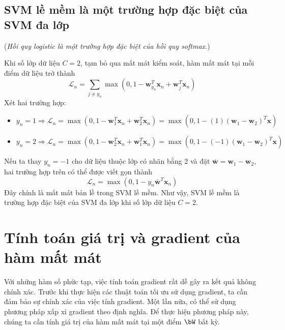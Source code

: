  
\subsection{SVM lề mềm là một trường hợp đặc biệt của SVM đa lớp}
(\textit{Hồi quy logistic là một trường hợp đặc biệt của hồi quy softmax.})

Khi số lớp dữ liệu $C = 2$, tạm bỏ qua mất mát kiểm soát, hàm mất mát tại mỗi điểm dữ liệu trở thành
\begin{equation} 
\mathcal{L}_n = \sum_{j \neq y_n} \max(0, 1 - \mathbf{w}_{y_n}^T \mathbf{x}_n + \mathbf{w}_j^T\mathbf{x}_n) 
\end{equation} 
Xét hai trường hợp: 
\begin{itemize}
    \item $y_n = 1 \Rightarrow \mathcal{L}_n = \max(0, 1 - \mathbf{w}_1^T\mathbf{x}_n + \mathbf{w}_2^T\mathbf{x}_n) = \max(0, 1 - (1)(\mathbf{w}_1 - \mathbf{w}_2)^T\mathbf{x})$ 
     
    \item $y_n = 2 \Rightarrow \mathcal{L}_n = \max(0, 1 - \mathbf{w}_2^T\mathbf{x}_n + \mathbf{w}_1^T\mathbf{x}_n) = \max(0, 1 - (-1)(\mathbf{w}_1 - \mathbf{w}_2)^T\mathbf{x})$ 
\end{itemize}
Nếu ta thay $y_n = -1$ cho dữ liệu thuộc lớp có nhãn bằng 2 và đặt
$\mathbf{\bar{w}} = \mathbf{w}_1 - \mathbf{w}_2$, hai trường hợp trên có thể được viết gọn thành
\begin{equation*} 
\mathcal{L}_n = \max(0, 1 - y_n\mathbf{\bar{w}}^T\mathbf{x}_n) 
\end{equation*} 
Đây chính là mất mát bản lề trong SVM lề mềm. Như vậy, SVM lề mềm là trường hợp đặc biệt của SVM đa lớp khi số lớp dữ liệu $C = 2$.

\section{Tính toán giá trị và gradient của hàm mất mát}
\label{sec:22_3}
Với những hàm số phức tạp, việc tính toán gradient rất dễ gây ra kết quả không
chính xác. Trước khi thực hiện các thuật toán tối ưu sử dụng gradient, ta cần
đảm bảo sự chính xác của việc tính gradient. Một lần nữa, có thể sử dụng phương pháp xấp xỉ gradient theo định nghĩa. Để thực hiện phương pháp này, chúng ta
cần tính giá trị của hàm mất mát tại một điểm $\bW$ bất kỳ.

